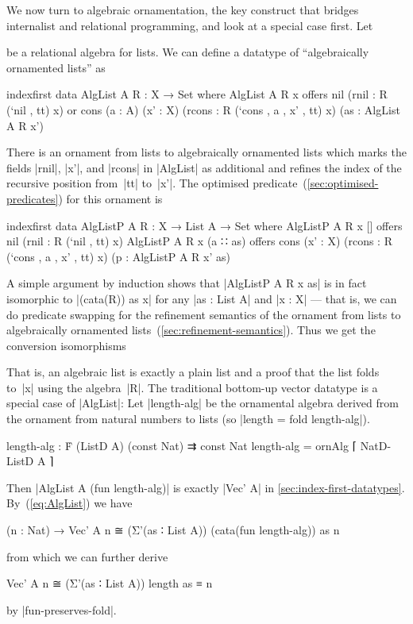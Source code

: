 We now turn to algebraic ornamentation, the key construct that bridges internalist and relational programming, and look at a special case first.
Let
be a relational algebra for lists.
We can define a datatype of ``algebraically ornamented lists'' as
\begin{code}
indexfirst data AlgList A R : X → Set where
  AlgList A R x  offers  nil (rnil : R (`nil , tt) x)
                 or      cons  (a : A) (x' : X) (rcons : R (`cons , a , x' , tt) x)
                               (as : AlgList A R x')
\end{code}
There is an ornament from lists to algebraically ornamented lists which marks the fields |rnil|, |x'|, and |rcons| in |AlgList| as additional and refines the index of the recursive position from~|tt| to~|x'|.
The optimised predicate~(\autoref{sec:optimised-predicates}) for this ornament is
\begin{code}
indexfirst data AlgListP A R : X → List A → Set where
  AlgListP A R x []        offers  nil (rnil : R (`nil , tt) x)
  AlgListP A R x (a ∷ as)  offers  cons  (x' : X) (rcons : R (`cons , a , x' , tt) x)
                                         (p : AlgListP A R x' as)
\end{code}
A simple argument by induction shows that |AlgListP A R x as| is in fact isomorphic to |(cata(R)) as x| for any |as : List A| and |x : X| --- that is, we can do predicate swapping for the refinement semantics of the ornament from lists to algebraically ornamented lists~(\autoref{sec:refinement-semantics}).
Thus we get the conversion isomorphisms
That is, an algebraic list is exactly a plain list and a proof that the list folds to~|x| using the algebra~|R|.
The traditional bottom-up vector datatype is a special case of |AlgList|: Let |length-alg| be the ornamental algebra derived from the ornament from natural numbers to lists (so |length = fold length-alg|).
\begin{code}
length-alg :  Ḟ (ListD A) (const Nat) ⇉ const Nat
length-alg = ornAlg ⌈ NatD-ListD A ⌉
\end{code}
Then |AlgList A (fun length-alg)| is exactly |Vec' A| in \autoref{sec:index-first-datatypes}.
By~(\ref{eq:AlgList}) we have
\begin{code}
(n : Nat) → Vec' A n ≅ (Σ'(as ∶ List A)) (cata(fun length-alg)) as n
\end{code}
from which we can further derive
\begin{code}
Vec' A n ≅ (Σ'(as ∶ List A)) length as ≡ n
\end{code}
by |fun-preserves-fold|.

